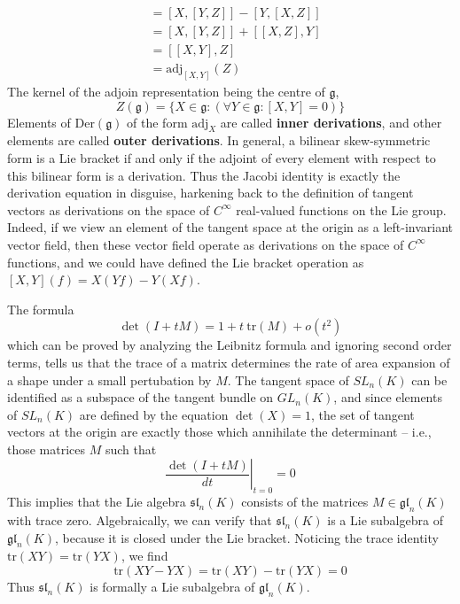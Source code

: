 \begin{example}
\begin{align*}
        &= [X,[Y,Z]] - [Y,[X,Z]]\\
        &= [X,[Y,Z]] + [[X,Z],Y]\\
        &= [[X,Y],Z]\\
        &= \text{adj}_{[X,Y]}(Z)
    \end{align*}
    The kernel of the adjoin representation being the centre of $\mathfrak{g}$,
    \[ Z(\mathfrak{g}) = \{ X \in \mathfrak{g} : (\forall Y \in \mathfrak{g}: [X,Y] = 0) \} \]
    Elements of $\text{Der}(\mathfrak{g})$ of the form $\text{adj}_X$ are called {\bf inner derivations}, and other elements are called {\bf outer derivations}. In general, a bilinear skew-symmetric form is a Lie bracket if and only if the adjoint of every element with respect to this bilinear form is a derivation. Thus the Jacobi identity is exactly the derivation equation in disguise, harkening back to the definition of tangent vectors as derivations on the space of $C^\infty$ real-valued functions on the Lie group. Indeed, if we view an element of the tangent space at the origin as a left-invariant vector field, then these vector field operate as derivations on the space of $C^\infty$ functions, and we could have defined the Lie bracket operation as $[X, Y](f) = X(Yf) - Y(Xf)$.
\end{example}

\begin{example}
    The formula
    \[ \det(I + tM) = 1 + t\ \text{tr}(M) + o(t^2) \]
    which can be proved by analyzing the Leibnitz formula and ignoring second order terms, tells us that the trace of a matrix determines the rate of area expansion of a shape under a small pertubation by $M$. The tangent space of $SL_n(K)$ can be identified as a subspace of the tangent bundle on $GL_n(K)$, and since elements of $SL_n(K)$ are defined by the equation $\det(X) = 1$, the set of tangent vectors at the origin are exactly those which annihilate the determinant -- i.e., those matrices $M$ such that
    \[ \left. \frac{\det(I + tM)}{dt} \right|_{t = 0} = 0 \]
    This implies that the Lie algebra $\mathfrak{sl}_n(K)$ consists of the matrices $M \in \mathfrak{gl}_n(K)$ with trace zero. Algebraically, we can verify that $\mathfrak{sl}_n(K)$ is a Lie subalgebra of $\mathfrak{gl}_n(K)$, because it is closed under the Lie bracket. Noticing the trace identity $\text{tr}(XY) = \text{tr}(YX)$, we find
    \[ \text{tr}(XY - YX) = \text{tr}(XY) - \text{tr}(YX) = 0 \]
    Thus $\mathfrak{sl}_n(K)$ is formally a Lie subalgebra of $\mathfrak{gl}_n(K)$.
\end{example}

